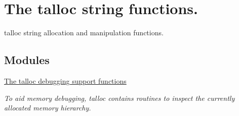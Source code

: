 \hypertarget{group__talloc__string}{}\section{The talloc string functions.}
\label{group__talloc__string}


talloc string allocation and manipulation functions.  


\subsection*{Modules}
\begin{DoxyCompactItemize}
\item 
\hyperlink{group__talloc__debug}{The talloc debugging support functions}
\begin{DoxyCompactList}\small\item\em To aid memory debugging, talloc contains routines to inspect the currently allocated memory hierarchy. \end{DoxyCompactList}\end{DoxyCompactItemize}
